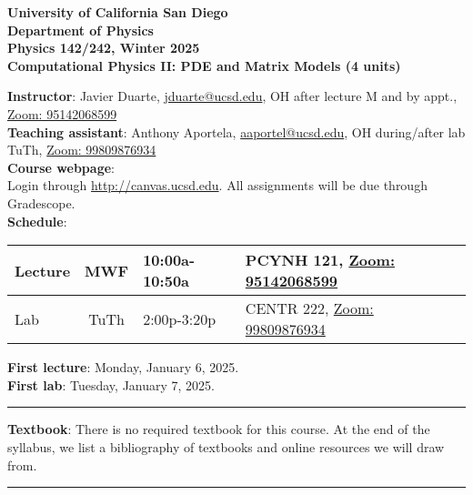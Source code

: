 \documentclass[12pt]{article}
\begin{document}
\begin{center}
  \textbf{
    University of California San Diego\\
    Department of Physics\\
    Physics 142/242, Winter 2025\\
    Computational Physics II: PDE and Matrix Models (4 units)
  }
\end{center}

\noindent\textbf{Instructor}: Javier Duarte, \href{mailto:jduarte@ucsd.edu}{jduarte@ucsd.edu}, OH after lecture M and by appt., \href{https://ucsd.zoom.us/j/95142068599}{Zoom: 95142068599}\\
\noindent \textbf{Teaching assistant}: Anthony Aportela, \href{mailto:aaportel@ucsd.edu}{aaportel@ucsd.edu}, OH during/after lab TuTh, \href{https://ucsd.zoom.us/j/99809876934}{Zoom: 99809876934}\\

\noindent\textbf{Course webpage}:\\
\hspace*{1cm}Login through \href{http://canvas.ucsd.edu}{http://canvas.ucsd.edu}.
All assignments will be due through Gradescope.\\

\noindent\textbf{Schedule}:
\begin{center}
  \begin{tabular}{|l|c|l|m{90mm}|}
    \hline
    Lecture & MWF  & 10:00a-10:50a & PCYNH	121, \href{https://ucsd.zoom.us/j/95142068599}{Zoom: 95142068599} \\\hline
    Lab     & TuTh & 2:00p-3:20p   & CENTR	222, \href{https://ucsd.zoom.us/j/99809876934}{Zoom: 99809876934} \\\hline\end{tabular}
\end{center}

\noindent\textbf{First lecture}: Monday, January 6, 2025.\\
\textbf{First lab}: Tuesday, January 7, 2025.

\begin{center}
  \rule{\textwidth}{0.5pt}
\end{center}

\noindent\textbf{Textbook}: There is no required textbook for this course.
At the end of the syllabus, we list a bibliography of textbooks and online resources we will draw from.

\begin{center}
  \rule{\textwidth}{0.5pt}
\end{center}
\end{document}

